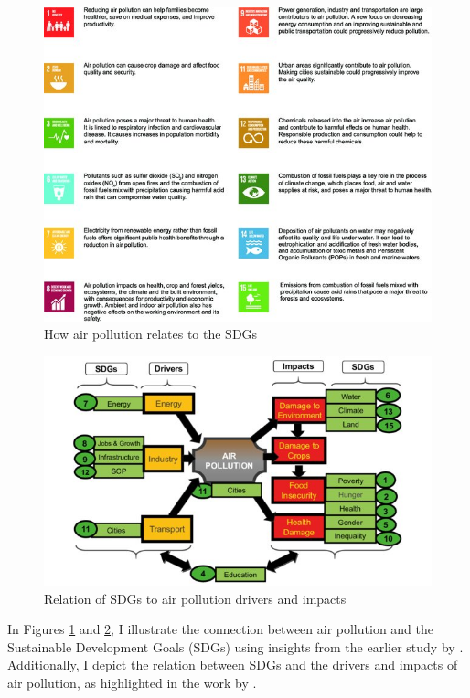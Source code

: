 \begin{figure}[tbh!]
    \centering
    \includegraphics[width=\textwidth]{figs/chap2/How-air-pollution-relates-to-the-UN-Sustainable-Development-Goals_W640.jpg}
    \caption{How air pollution relates to the SDGs \citep{aq2017eu}}
    \label{fig:chap2_fig3}
\end{figure}
\begin{figure}[tbh!]
    \centering
    \includegraphics[width=\textwidth]{figs/chap2/Relation-of-SDGs-to-Air-Pollutions-Drivers-and-Impacts.jpg}
    \caption{Relation of SDGs to air pollution drivers and impacts \citep{elder2016strengthening}}
    \label{fig:chap2_fig4}
\end{figure}
In Figures \ref{fig:chap2_fig3} and \ref{fig:chap2_fig4}, I illustrate the connection between air pollution and the Sustainable Development Goals (SDGs) using insights from the earlier study by \citep{aq2017eu}. Additionally, I depict the relation between SDGs and the drivers and impacts of air pollution, as highlighted in the work by \citep{elder2016strengthening}. 
